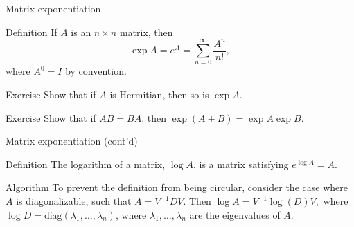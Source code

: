 \documentclass{beamer}
\newcommand{\diag}{\text{diag}}
\begin{document}

\begin{frame}{Matrix exponentiation}
    \begin{block}{Definition}
        If $A$ is an $n \times n$ matrix, then
        $$ \exp A = e^A = \sum_{n=0}^\infty \frac{A^n}{n!}, $$
        where $A^0 = I$ by convention.
    \end{block}
    \begin{block}{Exercise}
        Show that if $A$ is Hermitian, then so is $\exp A$.
    \end{block}
    \begin{block}{Exercise}
        Show that if $AB=BA$, then $\exp(A + B) = \exp A \exp B.$
    \end{block}
\end{frame}

\begin{frame}{Matrix exponentiation (cont'd)}
    \begin{block}{Definition}
        The logarithm of a matrix, $\log A$, is a matrix satisfying $e^{\log A} = A$.
    \end{block}
    \begin{block}{Algorithm}
        To prevent the definition from being circular, consider the case where $A$ is
        diagonalizable, such that $A=V^{-1}DV$. Then $\log A=V^{-1}\log (D) V,$ where
        $\log D=\diag(\lambda_1,\ldots,\lambda_n)$, where $\lambda_1,\ldots,\lambda_n$
        are the eigenvalues of $A$.
    \end{block}
\end{frame}
\end{document}
